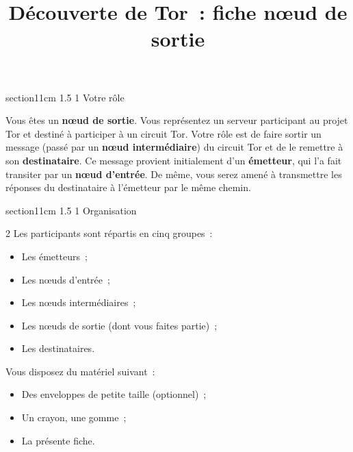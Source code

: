 \documentclass[a4paper,twoside,french]{article}
\makeatletter
\renewcommand\section{\@startsection
  {section}{1}{1cm}%
  {1.5\baselineskip}%
  {1\baselineskip}%
  {\normalfont\Large\bfseries}}%
\makeatother
\begin{document}
  
  \title{Découverte de Tor~: fiche \og n\oe ud de sortie\fg}
  \date{}

  \maketitle
  \pagestyle{empty}
  \thispagestyle{empty}

  \section{Votre rôle}

  Vous êtes un \textbf{n\oe ud de sortie}. Vous représentez un serveur
  participant au projet Tor et destiné à participer à un circuit
  Tor. Votre rôle est de faire sortir un message (passé par un
  \textbf{n\oe ud intermédiaire}) du circuit Tor et de le remettre à
  son \textbf{destinataire}. Ce message provient initialement d'un
  \textbf{émetteur}, qui l'a fait transiter par un \textbf{n\oe ud
    d'entrée}. De même, vous serez amené à transmettre les réponses du
  destinataire à l'émetteur par le même chemin.
  
  \section{Organisation}

  \begin{multicols}{2}
    Les participants sont répartis en cinq groupes~:
    \begin{itemize}
    \item Les émetteurs~;
    \item Les n\oe uds d'entrée~;
    \item Les n\oe uds intermédiaires~;
    \item Les n\oe uds de sortie (dont vous faites partie)~;
    \item Les destinataires.
    \end{itemize}
    \vfill\columnbreak

    Vous disposez du matériel suivant~:
    \begin{itemize}
    \item Des enveloppes de petite taille (optionnel)~;
    \item Un crayon, une gomme~;
    \item La présente fiche.
    \end{itemize}
  \end{multicols}
\end{document}
